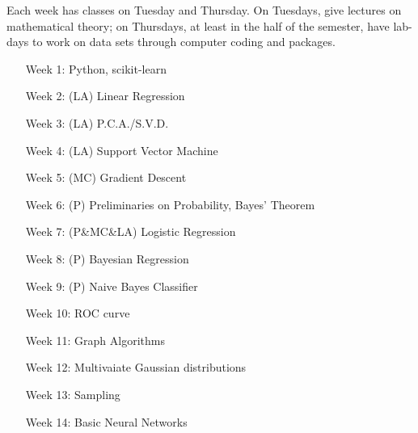 \documentclass[letter,11pt]{report}
\begin{document}
Each week has classes on Tuesday and Thursday. On Tuesdays, give lectures on mathematical theory; on Thursdays, at least in the half of the semester, have lab-days to work on data sets through computer coding and packages. 


\begin{enumerate}

\item[Week 1:] 
Python, scikit-learn

\item[Week 2:]
(LA) Linear Regression

\item[Week 3:]
(LA) P.C.A./S.V.D.

\item[Week 4:] 
(LA) Support Vector Machine

\item[Week 5:]
(MC) Gradient Descent

\item[Week 6:] 
(P) Preliminaries on Probability, Bayes' Theorem 

\item[Week 7:]
(P\&MC\&LA) Logistic Regression

\item[Week 8:]
(P) Bayesian Regression 

\item[Week 9:]
(P) Naive Bayes Classifier

\item[Week 10:] 
ROC curve

\item[Week 11:] 
Graph Algorithms

\item[Week 12:] 
Multivaiate Gaussian distributions

\item[Week 13:] 
Sampling

\item[Week 14:] 
Basic Neural Networks

   
\end{enumerate}
\end{document}
